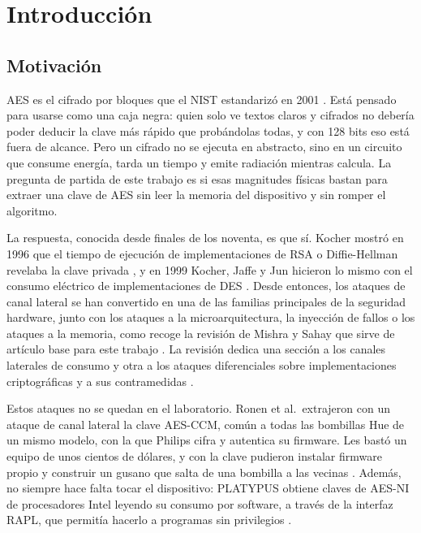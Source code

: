\chapter{Introducción}
\label{cap:introduccion}

\section{Motivación}
\label{sec:motivacion}

AES es el cifrado por bloques que el NIST estandarizó en 2001
\cite{nist2023fips197}. Está pensado para usarse como una caja negra: quien
solo ve textos claros y cifrados no debería poder deducir la clave más rápido
que probándolas todas, y con 128 bits eso está fuera de alcance. Pero un cifrado no se ejecuta en abstracto, sino en un
circuito que consume energía, tarda un tiempo y emite radiación mientras
calcula. La pregunta de partida de este trabajo es si esas magnitudes físicas
bastan para extraer una clave de AES sin leer la memoria del dispositivo y sin
romper el algoritmo.

La respuesta, conocida desde finales de los noventa, es que sí. Kocher mostró
en 1996 que el tiempo de ejecución de implementaciones de RSA o Diffie-Hellman
revelaba la clave privada \cite{kocher1996timing}, y en 1999 Kocher, Jaffe y
Jun hicieron lo mismo con el consumo eléctrico de implementaciones de DES
\cite{kocher1999dpa}. Desde entonces, los ataques de canal lateral se han
convertido en una de las familias principales de la seguridad hardware, junto
con los ataques a la microarquitectura, la inyección de fallos o los ataques a
la memoria, como recoge la revisión de Mishra y Sahay que sirve de artículo
base para este trabajo \cite{mishra2025modern}. La revisión dedica una sección
a los canales laterales de consumo y otra a los ataques diferenciales sobre
implementaciones criptográficas y a sus contramedidas
\cite[secs.~II.B, III.C y III.D]{mishra2025modern}.

Estos ataques no se quedan en el laboratorio. Ronen et al.\ extrajeron con un
ataque de canal lateral la clave AES-CCM, común a todas las bombillas Hue de un
mismo modelo, con la que Philips cifra y autentica su firmware. Les bastó un
equipo de unos cientos de dólares, y con la clave pudieron instalar firmware
propio y construir un gusano que salta de una bombilla a las vecinas
\cite{ronen2017iot}. Además, no siempre hace falta tocar el dispositivo:
PLATYPUS obtiene claves de AES-NI de procesadores Intel leyendo su consumo por
software, a través de la interfaz RAPL, que permitía hacerlo a programas sin
privilegios \cite{lipp2021platypus}.

